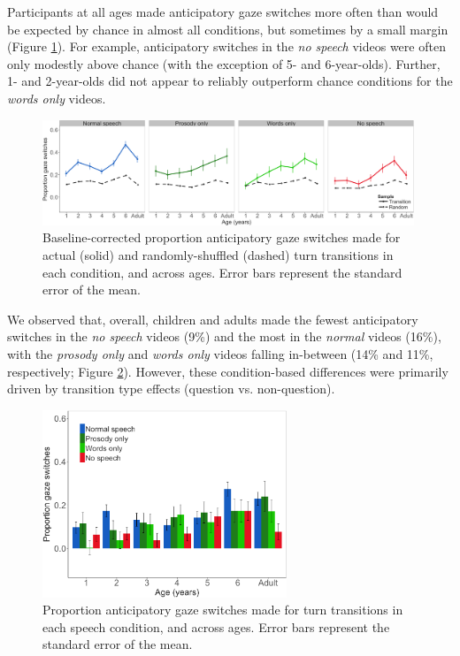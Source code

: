 \documentclass[authoryear, 12pt]{elsarticle}
\begin{document}
Participants at all ages made anticipatory gaze switches more often than would be expected by chance in almost all conditions, but sometimes by a small margin (Figure \ref{fig:randvsrealEN}). For example, anticipatory switches in the \textit{no speech} videos were often only modestly above chance (with the exception of 5- and 6-year-olds). Further, 1- and 2-year-olds did not appear to reliably outperform chance conditions for the \textit{words only} videos.

\begin{figure}[t]
\begin{center}
\includegraphics[width=0.99\textwidth]{figures/FIG-randvsreal-EN.png}
\end{center}
\caption{Baseline-corrected proportion anticipatory gaze switches made for actual (solid) and randomly-shuffled (dashed) turn transitions in each condition, and across ages. Error bars represent the standard error of the mean.} 
\label{fig:randvsrealEN}
\end{figure}

We observed that, overall, children and adults made the fewest anticipatory switches in the \textit{no speech} videos (9\%) and the most in the \textit{normal} videos (16\%), with the \textit{prosody only} and \textit{words only} videos falling in-between (14\% and 11\%, respectively; Figure \ref{fig:conditionsEN}). However, these condition-based differences were primarily driven by transition type effects (question vs. non-question).

\begin{figure}[t]
\begin{center}
\includegraphics[width=0.65\textwidth]{figures/FIG-conditions-EN.png}
\end{center}
\caption{Proportion anticipatory gaze switches made for turn transitions in each speech condition, and across ages. Error bars represent the standard error of the mean.} 
\label{fig:conditionsEN}
\end{figure}
\end{document}
